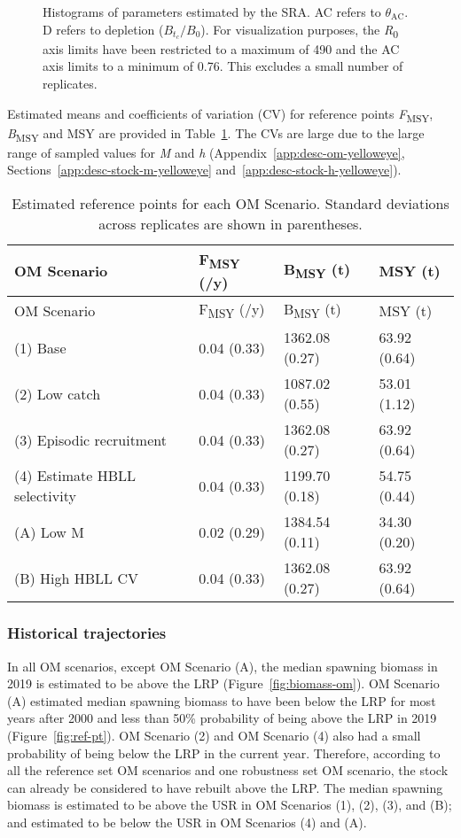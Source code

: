 \documentclass[11pt]{book}
\begin{document}
\begin{figure}[htb]

{\centering {} 

}

\caption{Histograms of parameters estimated by the SRA. AC refers to \(\theta_\textrm{AC}\). D refers to depletion (\(B_{t_c}/B_0\)). For visualization purposes, the \emph{R}\textsubscript{0} axis limits have been restricted to a maximum of 490 and the AC axis limits to a minimum of 0.76. This excludes a small number of replicates.}\label{fig:sra-conditioned-parameters}
\end{figure}
Estimated means and coefficients of variation (CV) for reference points \emph{F}\textsubscript{MSY}, \emph{B}\textsubscript{MSY} and MSY are provided in Table~\ref{tab:sra-ref-pts}. The CVs are large due to the large range of sampled values for \emph{M} and \emph{h} (Appendix~\ref{app:desc-om-yelloweye}, Sections~\ref{app:desc-stock-m-yelloweye} and~\ref{app:desc-stock-h-yelloweye}).
\begin{longtable}[]{@{}llll@{}}
\caption{\label{tab:sra-ref-pts}Estimated reference points for each OM Scenario. Standard deviations across replicates are shown in parentheses.}\tabularnewline
\toprule
OM Scenario & F\textsubscript{MSY} (/y) & B\textsubscript{MSY} (t) & MSY (t)\tabularnewline
\midrule
\endfirsthead
\toprule
OM Scenario & F\textsubscript{MSY} (/y) & B\textsubscript{MSY} (t) & MSY (t)\tabularnewline
\midrule
\endhead
(1) Base & 0.04 (0.33) & 1362.08 (0.27) & 63.92 (0.64)\tabularnewline
(2) Low catch & 0.04 (0.33) & 1087.02 (0.55) & 53.01 (1.12)\tabularnewline
(3) Episodic recruitment & 0.04 (0.33) & 1362.08 (0.27) & 63.92 (0.64)\tabularnewline
(4) Estimate HBLL selectivity & 0.04 (0.33) & 1199.70 (0.18) & 54.75 (0.44)\tabularnewline
(A) Low M & 0.02 (0.29) & 1384.54 (0.11) & 34.30 (0.20)\tabularnewline
(B) High HBLL CV & 0.04 (0.33) & 1362.08 (0.27) & 63.92 (0.64)\tabularnewline
\bottomrule
\end{longtable}
\clearpage

\hypertarget{sec:approach3-conditioning-trajectories}{%
\subsubsection{Historical trajectories}\label{sec:approach3-conditioning-trajectories}}

In all OM scenarios, except OM Scenario (A), the median spawning biomass in 2019 is estimated to be above the LRP (Figure~\ref{fig:biomass-om}). OM Scenario (A) estimated median spawning biomass to have been below the LRP for most years after 2000 and less than 50\% probability of being above the LRP in 2019 (Figure~\ref{fig:ref-pt}). OM Scenario (2) and OM Scenario (4) also had a small probability of being below the LRP in the current year. Therefore, according to all the reference set OM scenarios and one robustness set OM scenario, the stock can already be considered to have rebuilt above the LRP. The median spawning biomass is estimated to be above the USR in OM Scenarios (1), (2), (3), and (B); and estimated to be below the USR in OM Scenarios (4) and (A).
\end{document}
